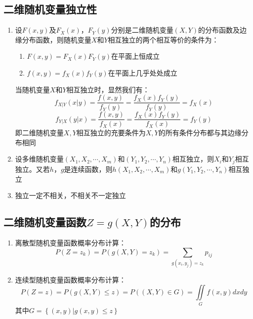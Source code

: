 \documentclass[12pt,a4paper,UTF8]{book}
\begin{document}
\subsection{二维随机变量独立性}
\begin{enumerate}
\item 设$F\left(x,y\right)$及$F_X\left(x\right)$，$F_Y\left(y\right)$分别是二维随机变量$\left(X,Y\right)$的分布函数及边缘分布函数，则随机变量$X$和$Y$相互独立的两个相互等价的条件为：
\begin{enumerate}
\item $F\left(x,y\right)=F_X\left(x\right)F_Y\left(y\right)$在平面上恒成立
\item $f\left(x,y\right)=f_X\left(x\right)f_Y\left(y\right)$在平面上几乎处处成立
\end{enumerate}
当随机变量$X$和$Y$相互独立时，显然我们有：
\[f_{X|Y}\left(x|y\right)=\frac{f\left(x,y\right)}{f_Y\left(y\right)}=\frac{f_X\left(x\right)f_Y\left(y\right)}{f_Y\left(y\right)}=f_X\left(x\right)\]
\[f_{Y|X}\left(y|x\right)=\frac{f\left(x,y\right)}{f_X\left(x\right)}=\frac{f_X\left(x\right)f_Y\left(y\right)}{f_X\left(x\right)}=f_Y\left(y\right)\]
即二维随机变量$X,Y$相互独立的充要条件为$X,Y$的所有条件分布都与其边缘分布相同
\item 设多维随机变量$\left(X_1,X_2,\cdots,X_m\right)$和$\left(Y_1,Y_2,\cdots,Y_n\right)$相互独立，则$X_i$和$Y_j$相互独立。又若$h$，$g$是连续函数，则$h\left(X_1,X_2,\cdots,X_m\right)$和$g\left(Y_1,Y_2,\cdots,Y_n\right)$相互独立
\item 独立一定不相关，不相关不一定独立
\end{enumerate}

\subsection{二维随机变量函数$Z=g\left(X,Y\right)$的分布}
\begin{enumerate}
\item 离散型随机变量函数概率分布计算：
\[P\left(Z=z_k\right)=P\left(g\left(X,Y\right)=z_k\right)=\sum\limits_{g\left(x_i,y_j\right)=z_k}p_{ij}\]
\item 连续型随机变量函数概率分布计算：
\[P\left(Z=z\right)=P\left(g\left(X,Y\right)\leq z\right)=P\left(\left(X,Y\right)\in G\right)=\iint\limits_{G}f\left(x,y\right)dxdy\]
其中$G=\left\{\left(x,y\right)|g\left(x,y\right)\leq z\right\}$
\end{enumerate}
\end{document}
